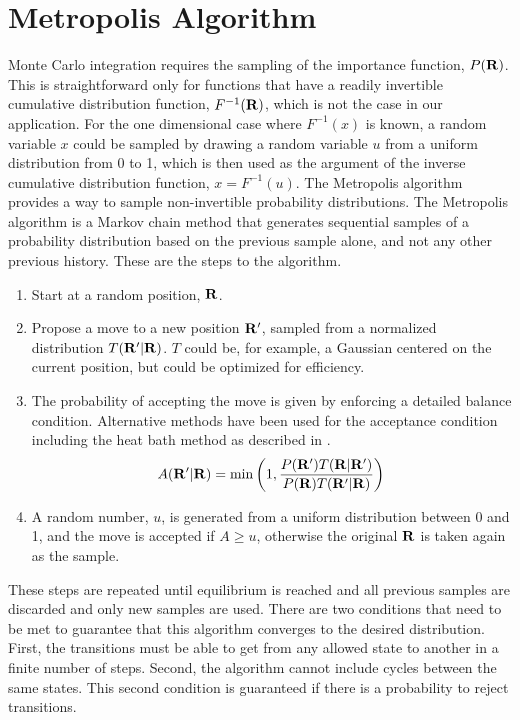 \section{Metropolis Algorithm}
Monte Carlo integration requires the sampling of the importance function, $P(\mathbf{R})$. This is straightforward only for functions that have a readily invertible cumulative distribution function, $F^{-1}(\mathbf{R})$, which is not the case in our application. For the one dimensional case where $F^{-1}(x)$ is known, a random variable $x$ could be sampled by drawing a random variable $u$ from a uniform distribution from 0 to 1, which is then used as the argument of the inverse cumulative distribution function, $x=F^{-1}(u)$. The Metropolis algorithm provides a way to sample non-invertible probability distributions. The Metropolis algorithm is a Markov chain method that generates sequential samples of a probability distribution based on the previous sample alone, and not any other previous history. These are the steps to the algorithm.
\begin{enumerate}
   \item Start at a random position, $\mathbf{R}$.
   \item Propose a move to a new position $\mathbf{R}'$, sampled from a normalized distribution $T(\mathbf{R}'|\mathbf{R})$. $T$ could be, for example, a Gaussian centered on the current position, but could be optimized for efficiency.
   \item The probability of accepting the move is given by enforcing a detailed balance condition. Alternative methods have been used for the acceptance condition including the heat bath method as described in \cite{sethna2006}.
   \begin{equation}
      A(\mathbf{R}'|\mathbf{R}) = \mathrm{min}\left(1, \frac{P(\mathbf{R}')T(\mathbf{R}|\mathbf{R}')}{P(\mathbf{R})T(\mathbf{R}'|\mathbf{R})}\right)
   \end{equation}
   \item A random number, $u$, is generated from a uniform distribution between 0 and 1, and the move is accepted if $A\ge u$, otherwise the original $\mathbf{R}$ is taken again as the sample.
\end{enumerate}

These steps are repeated until equilibrium is reached and all previous samples are discarded and only new samples are used. There are two conditions that need to be met to guarantee that this algorithm converges to the desired distribution. First, the transitions must be able to get from any allowed state to another in a finite number of steps. Second, the algorithm cannot include cycles between the same states. This second condition is guaranteed if there is a probability to reject transitions.

